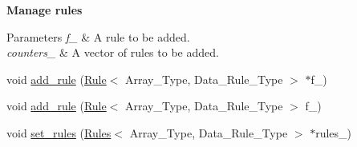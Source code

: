 \begin{Indent}\textbf{ Manage rules}\par
{\em 
\begin{DoxyParams}{Parameters}
{\em f\+\_\+} & A rule to be added. \\
\hline
{\em counters\+\_\+} & A vector of rules to be added. \\
\hline
\end{DoxyParams}
}\begin{DoxyCompactItemize}
\item 
void \hyperlink{classbarry_1_1_support_a3113a4586c541aa25db7b4a864b748a2}{add\+\_\+rule} (\hyperlink{classbarry_1_1_rule}{Rule}$<$ Array\+\_\+\+Type, Data\+\_\+\+Rule\+\_\+\+Type $>$ $\ast$f\+\_\+)
\item 
void \hyperlink{classbarry_1_1_support_aa817cb5d6c48dda3ecfeef2c5897b537}{add\+\_\+rule} (\hyperlink{classbarry_1_1_rule}{Rule}$<$ Array\+\_\+\+Type, Data\+\_\+\+Rule\+\_\+\+Type $>$ f\+\_\+)
\item 
void \hyperlink{classbarry_1_1_support_a66dc1a0e7097d547ea9c84df777ad477}{set\+\_\+rules} (\hyperlink{classbarry_1_1_rules}{Rules}$<$ Array\+\_\+\+Type, Data\+\_\+\+Rule\+\_\+\+Type $>$ $\ast$rules\+\_\+)
\end{DoxyCompactItemize}
\end{Indent}
